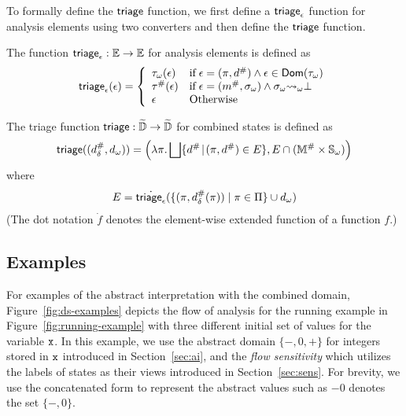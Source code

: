 To formally define the $\triage$ function, we first define a $\atriage$ function
for analysis elements using two converters and then define the $\triage$ function.
\begin{definition}[$\atriage$]\label{def:atriage}
  The function $\textsf{triage}_\epsilon: \mathbb{E} \rightarrow \mathbb{E}$ for analysis elements
  is defined as
  \[
    \textsf{triage}_\epsilon(\epsilon) = \left\{
      \begin{array}{ll}
        {\tau}_\omega(\epsilon)
        & \text{if} \; \epsilon = (\pi, {d}^{\#}) \wedge \epsilon \in
        \textsf{Dom}({\tau}_\omega)\\
        {\tau}^{\#}(\epsilon)
        & \text{if} \; \epsilon = ({m}^{\#}, {\sigma}_\omega) \wedge {\sigma}_\omega {\leadsto}_\omega
        \bot\\
        \epsilon
        & \text{Otherwise}
      \end{array}
    \right.
  \]
\end{definition}
\begin{definition}[$\triage$]\label{def:triage}
  The triage function $\textsf{triage}: \widetilde{\mathbb{D}} \rightarrow \widetilde{\mathbb{D}}$ for combined
  states is defined as
  \[
    \textsf{triage}(({{d}^{\#}_\delta}, {d}_\omega)) = \left(
      \lambda \pi. \bigsqcup \{ {d}^{\#} \!\mid\! (\pi, {d}^{\#}) \in E \},
      E \cap ({\mathbb{M}}^{\#} \times {\mathbb{S}}_\omega)
    \right)
  \]
  where
  \[
    E = \dot{\textsf{triage}_\epsilon}(\{ (\pi, {{d}^{\#}_\delta}(\pi)) \mid \pi \in \Pi \} \cup {d}_\omega)
  \]
  (The dot notation $\dot{f}$ denotes the element-wise extended function of a
  function $f$.)
\end{definition}


\subsection{Examples}

For examples of the abstract interpretation with the combined domain,
Figure~\ref{fig:ds-examples} depicts the flow of analysis for the running
example in Figure~\ref{fig:running-example} with three different initial set of
values for the variable $\texttt{x}$.  In this example, we use the abstract domain
$\{ -, 0, + \}$ for integers stored in $\texttt{x}$ introduced in
Section~\ref{sec:ai}, and the \textit{flow sensitivity} which utilizes the
labels of states as their views introduced in Section~\ref{sec:sens}.  For
brevity, we use the concatenated form to represent the abstract values such as
$-0$ denotes the set $\{ -, 0 \}$.

